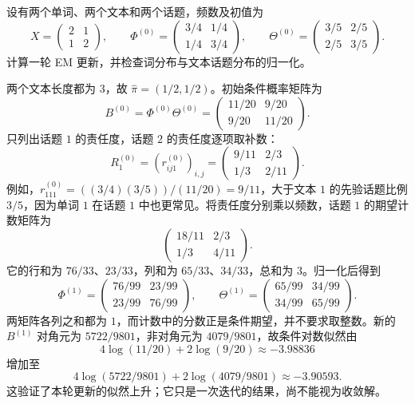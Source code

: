 \begin{example}
\label{ex:lh-plsa-one-em-step}
设有两个单词、两个文本和两个话题，频数及初值为
\[
X=\begin{pmatrix}2&1\\1&2\end{pmatrix},\qquad
\Phi^{(0)}=\begin{pmatrix}3/4&1/4\\1/4&3/4\end{pmatrix},\qquad
\Theta^{(0)}=\begin{pmatrix}3/5&2/5\\2/5&3/5\end{pmatrix}.
\]
计算一轮 EM 更新，并检查词分布与文本话题分布的归一化。
\end{example}
\begin{solve}
两个文本长度都为 $3$，故 $\widehat\pi=(1/2,1/2)$。初始条件概率矩阵为
\[
B^{(0)}=\Phi^{(0)}\Theta^{(0)}
=\begin{pmatrix}11/20&9/20\\9/20&11/20\end{pmatrix}.
\]
只列出话题 $1$ 的责任度，话题 $2$ 的责任度逐项取补数：
\[
R_1^{(0)}=(r_{ij1}^{(0)})_{i,j}
=\begin{pmatrix}9/11&2/3\\1/3&2/11\end{pmatrix}.
\]
例如，$r_{111}^{(0)}=((3/4)(3/5))/(11/20)=9/11$，大于文本 $1$ 的先验话题比例 $3/5$，因为单词 $1$ 在话题 $1$ 中也更常见。将责任度分别乘以频数，话题 $1$ 的期望计数矩阵为
\[
\begin{pmatrix}18/11&2/3\\1/3&4/11\end{pmatrix}.
\]
它的行和为 $76/33$、$23/33$，列和为 $65/33$、$34/33$，总和为 $3$。归一化后得到
\[
\Phi^{(1)}=\begin{pmatrix}76/99&23/99\\23/99&76/99\end{pmatrix},\qquad
\Theta^{(1)}=\begin{pmatrix}65/99&34/99\\34/99&65/99\end{pmatrix}.
\]
两矩阵各列之和都为 $1$，而计数中的分数正是条件期望，并不要求取整数。新的 $B^{(1)}$ 对角元为 $5722/9801$，非对角元为 $4079/9801$，故条件对数似然由
\[
4\log(11/20)+2\log(9/20)\approx-3.98836
\]
增加至
\[
4\log(5722/9801)+2\log(4079/9801)\approx-3.90593.
\]
这验证了本轮更新的似然上升；它只是一次迭代的结果，尚不能视为收敛解。
\end{solve}

